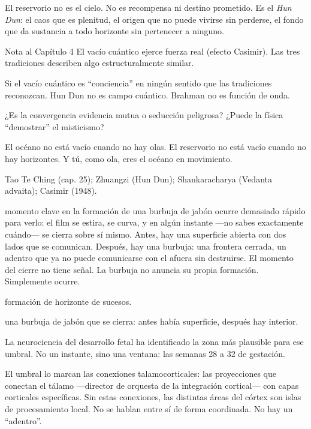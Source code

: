 El reservorio no es el cielo. No es recompensa ni destino prometido. Es el \emph{Hun Dun}: el caos que es plenitud, el origen que no puede vivirse sin perderse, el fondo que da sustancia a todo horizonte sin pertenecer a ninguno.

\begin{notacap}{Nota al Capítulo 4}
 El vacío cuántico ejerce fuerza real (efecto Casimir). Las tres tradiciones describen algo estructuralmente similar.

 Si el vacío cuántico es “conciencia” en ningún sentido que las tradiciones reconozcan. Hun Dun no es campo cuántico. Brahman no es función de onda.

 ¿Es la convergencia evidencia mutua o seducción peligrosa? ¿Puede la física “demostrar” el misticismo?

 El océano no está vacío cuando no hay olas. El reservorio no está vacío cuando no hay horizontes. Y tú, como ola, eres el océano en movimiento.

 Tao Te Ching (cap. 25); Zhuangzi (Hun Dun); Shankaracharya (Vedanta advaita); Casimir (1948).
\end{notacap}
\noindent {} momento clave en la formación de una burbuja de jabón ocurre demasiado rápido para verlo: el film se estira, se curva, y en algún instante —no sabes exactamente cuándo— se cierra sobre sí mismo. Antes, hay una superficie abierta con dos lados que se comunican. Después, hay una burbuja: una frontera cerrada, un adentro que ya no puede comunicarse con el afuera sin destruirse. El momento del cierre no tiene señal. La burbuja no anuncia su propia formación. Simplemente ocurre.

\begin{fisica}
 formación de horizonte de sucesos.

 una burbuja de jabón que se cierra: antes había superficie, después hay interior.
\end{fisica}
\noindent La neurociencia del desarrollo fetal ha identificado la zona más plausible para ese umbral. No un instante, sino una ventana: las semanas 28 a 32 de gestación.

El umbral lo marcan las conexiones talamocorticales: las proyecciones que conectan el tálamo —director de orquesta de la integración cortical— con capas corticales específicas. Sin estas conexiones, las distintas áreas del córtex son islas de procesamiento local. No se hablan entre sí de forma coordinada. No hay un “adentro”.

